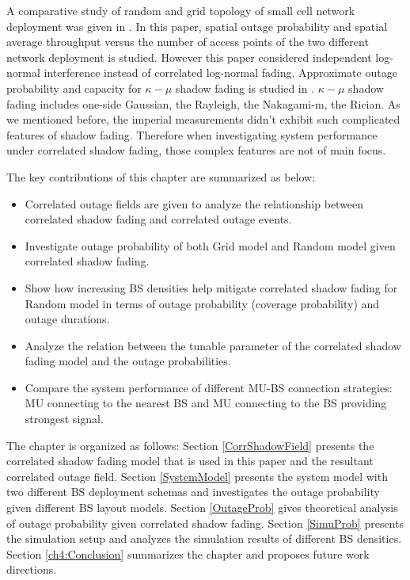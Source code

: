 \par A comparative study of random and grid topology of small cell network deployment was given in \cite{chen2012small}. In this paper, spatial outage probability and spatial average throughput versus the number of access points of the two different network deployment is studied. However this paper considered independent log-normal interference instead of correlated log-normal fading. Approximate outage probability and capacity for $\kappa-\mu$ shadow fading is studied in \cite{kumar2015approximate}. $\kappa-\mu$ shadow fading includes one-side Gaussian, the Rayleigh, the Nakagami-m, the Rician. As we mentioned before, the imperial measurements didn't exhibit such complicated features of shadow fading. Therefore when investigating system performance under correlated shadow fading, those complex features are not of main focus.
\par The key contributions of this chapter are summarized as below:
\begin{itemize}
\item Correlated outage fields are given to analyze the relationship between correlated shadow fading and correlated outage events. 
\item Investigate outage probability of both Grid model and Random model given correlated shadow fading.
\item Show how increasing BS densities help mitigate correlated shadow fading for Random model in terms of outage probability (coverage probability) and outage durations.
\item Analyze the relation between the tunable parameter of the correlated shadow fading model and the outage probabilities.
\item Compare the system performance of different MU-BS connection strategies: MU connecting to the nearest BS and MU connecting to the BS providing strongest signal.
\end{itemize}
The chapter is organized as follows: Section \ref{CorrShadowField} presents the correlated shadow fading model that is used in this paper and the resultant correlated outage field. Section \ref{SystemModel} presents the system model with two different BS deployment schemas and investigates the outage probability given different BS layout models. Section \ref{OutageProb} gives theoretical analysis of outage probability given correlated shadow fading. Section \ref{SimuProb} presents the simulation setup and analyzes the simulation results of different BS densities. Section \ref{ch4:Conclusion} summarizes the chapter and proposes future work directions.
